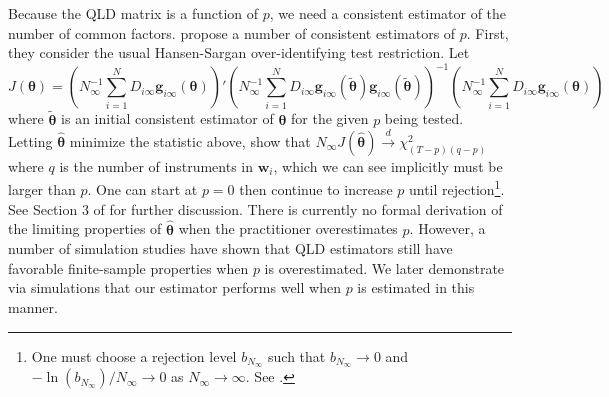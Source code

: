 \documentclass[12pt]{article}
\begin{document}
Because the QLD matrix is a function of $p$, we need a consistent estimator of the number of common factors. \citet{Ahn_Lee_Schmidt_2013} propose a number of consistent estimators of $p$. First, they consider the usual Hansen-Sargan over-identifying test restriction. Let
\begin{equation}
    J(\bm \theta) = \left( N_{\infty}^{-1} \sum_{i = 1}^N D_{i\infty} \bm g_{i\infty}(\bm \theta) \right)' \left( N_{\infty}^{-1} \sum_{i = 1}^N D_{i\infty} \bm g_{i\infty}(\tilde{\bm \theta}) \bm g_{i\infty}(\tilde{\bm \theta}) \right)^{-1} \left( N^{-1}_{\infty} \sum_{i = 1}^N D_{i\infty} \bm g_{i\infty}(\bm \theta) \right)
\end{equation}
where $\tilde{\bm \theta}$ is an initial consistent estimator of $\bm \theta$ for the given $p$ being tested. Letting $\widehat{\bm \theta}$ minimize the statistic above, \citet{Ahn_Lee_Schmidt_2013} show that $N_{\infty} J(\widehat{\bm \theta}) \stackrel{d}{\rightarrow} \chi^2_{(T-p)(q-p)}$ 
where $q$ is the number of instruments in $\bm w_i$, which we can see implicitly must be larger than $p$. One can start at $p = 0$ then continue to increase $p$ until rejection\footnote{One must choose a rejection level $b_{N_{\infty}}$ such that $b_{N_\infty} \rightarrow 0$ and $-\ln(b_{N_{\infty}}) / N_\infty \rightarrow 0$ as $N_{\infty} \rightarrow \infty$. See \citet{Cragg_Donald_1997inferring}.}. See Section 3 of \citet{Ahn_Lee_Schmidt_2013} for further discussion. There is currently no formal derivation of the limiting properties of $\widehat{\bm \theta}$ when the practitioner overestimates $p$. However, a number of simulation studies \citep{Ahn_Lee_Schmidt_2013,Breitung_Hansen_2021,Brown_2022} have shown that QLD estimators still have favorable finite-sample properties when $p$ is overestimated. We later demonstrate via simulations that our estimator performs well when $p$ is estimated in this manner. 
\end{document}
